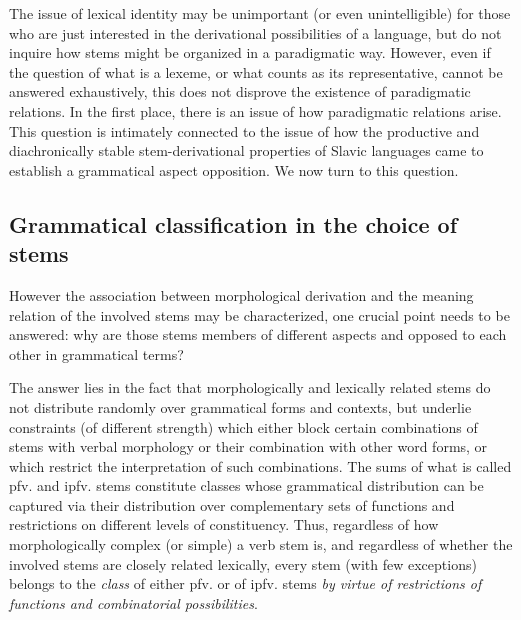 \documentclass[output=paper]{langscibook}
\begin{document}
The issue of lexical identity may be unimportant (or even unintelligible) for those who are just interested in the derivational possibilities of a language, but do not inquire how stems might be organized in a paradigmatic way. However, even if the question of what is a lexeme, or what counts as its representative, cannot be answered exhaustively, this does not disprove the existence of paradigmatic relations. In the first place, there is an issue of how paradigmatic relations arise. This question is intimately connected to the issue of how the productive and diachronically stable stem-derivational properties of Slavic languages came to establish a grammatical aspect opposition. We now turn to this question.

\subsection{Grammatical classification in the choice of stems}\label{wiemer:2.2}\largerpage

However the association between morphological derivation and the meaning relation of the involved stems may be characterized, one crucial point needs to be answered: why are those stems members of different aspects and opposed to each other in grammatical terms?

The answer lies in the fact that morphologically and lexically related stems do not distribute randomly over grammatical forms and contexts, but underlie constraints (of different strength) which either block certain combinations of stems with verbal morphology or their combination with other word forms, or which restrict the interpretation of such combinations. The sums of what is called pfv. and ipfv. stems constitute classes whose grammatical distribution can be captured via their distribution over complementary sets of functions and restrictions on different levels of constituency. Thus, regardless of how morphologically complex (or simple) a verb stem is, and regardless of whether the involved stems are closely related lexically, every stem (with few exceptions) belongs to the \emph{class} of either pfv. or of ipfv. stems \emph{by virtue of restrictions of functions and combinatorial possibilities}.
\end{document}
